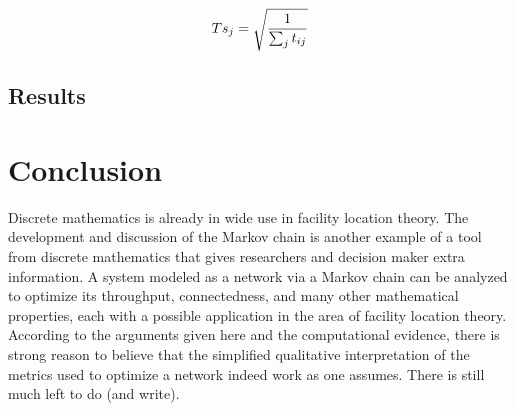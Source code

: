 \documentclass[twoside,twocolumn]{article}
\begin{document}
\begin{equation}
\begin{aligned}
Ts_j = \sqrt{1\over{\sum_j{t_{ij}}}}
\end{aligned}
\end{equation}

\subsection{Results}










\section{Conclusion}

Discrete mathematics is already in wide use in facility location theory. %
The development and discussion of the Markov chain is another example of a tool from discrete mathematics that  gives researchers and decision maker extra information.
A system modeled as a network via a Markov chain can be analyzed to optimize its throughput, connectedness, and many other mathematical properties, each with a possible application in the area of facility location theory.
According to the arguments given here and the computational evidence, there is strong reason to believe that the simplified qualitative interpretation of the metrics used to optimize a network indeed work as one assumes.
There is still much left to do (and write).





\end{document}
